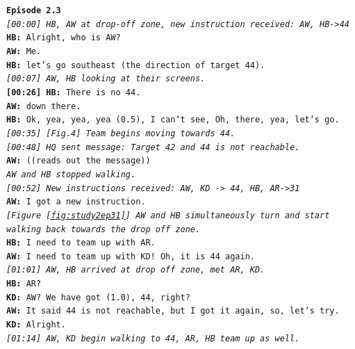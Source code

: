 \noindent\texttt{\textbf{Episode 2.3}\\
\emph{ [00:00] HB, AW at drop-off zone, new instruction received: AW, HB->44} \\
\textbf{HB:} Alright, who is AW? \\
\textbf{AW:} Me.\\
\textbf{HB:} let's go southeast (the direction of target 44).\\
\emph{[00:07] AW, HB looking at their screens.}\\
\textbf{[00:26] HB:} There is no 44.\\
\textbf{AW:} down there.\\
\textbf{HB:} Ok, yea, yea, yea (0.5), I can`t see, Oh, there, yea, let`s go.\\
\emph{[00:35] [Fig.4] Team begins moving towards 44.}\\
\emph{[00:48] HQ sent message: Target 42 and 44 is not reachable.} \\
\textbf{AW:} ((reads out the message))\\
\emph{AW and HB stopped walking.}\\
\emph{[00:52] New instructions received: AW, KD -> 44, HB, AR->31}\\
\textbf{AW:} I got a new instruction.\\
\emph{[Figure \ref{fig:study2ep31}] AW and HB simultaneously turn and start walking back towards the drop off zone.}\\
\textbf{HB:} I need to team up with AR.\\
\textbf{AW:} I need to team up with KD! Oh, it is 44 again.\\
\emph{ [01:01] AW, HB arrived at drop off zone, met AR, KD.} \\
\textbf{HB:} AR?\\
\textbf{KD:} AW? We have got (1.0), 44, right?\\
\textbf{AW:} It said 44 is not reachable, but I got it again, so, let`s try.\\
\textbf{KD:} Alright. \\
\emph{[01:14] AW, KD begin walking to 44, AR, HB team up as well.}\\
}



